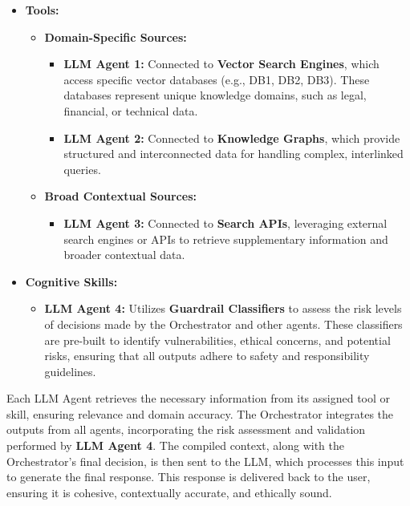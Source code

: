 \documentclass[12pt]{article}
\begin{document}
\begin{itemize}
    \item \textbf{Tools:}
    \begin{itemize}
        \item \textbf{Domain-Specific Sources:}
        \begin{itemize}
            \item \textbf{LLM Agent 1:} Connected to \textbf{Vector Search Engines}, which access specific vector databases (e.g., DB1, DB2, DB3). These databases represent unique knowledge domains, such as legal, financial, or technical data.
            \item \textbf{LLM Agent 2:} Connected to \textbf{Knowledge Graphs}, which provide structured and interconnected data for handling complex, interlinked queries.
        \end{itemize}
        \item \textbf{Broad Contextual Sources:}
        \begin{itemize}
            \item \textbf{LLM Agent 3:} Connected to \textbf{Search APIs}, leveraging external search engines or APIs to retrieve supplementary information and broader contextual data.
        \end{itemize}
    \end{itemize}
\newpage
    \item \textbf{Cognitive Skills:}
    \begin{itemize}
        \item \textbf{LLM Agent 4:} Utilizes \textbf{Guardrail Classifiers} to assess the risk levels of decisions made by the Orchestrator and other agents. These classifiers are pre-built to identify vulnerabilities, ethical concerns, and potential risks, ensuring that all outputs adhere to safety and responsibility guidelines.
    \end{itemize}
\end{itemize}

Each LLM Agent retrieves the necessary information from its assigned tool or skill, ensuring relevance and domain accuracy. The Orchestrator integrates the outputs from all agents, incorporating the risk assessment and validation performed by \textbf{LLM Agent 4}. The compiled context, along with the Orchestrator’s final decision, is then sent to the LLM, which processes this input to generate the final response. This response is delivered back to the user, ensuring it is cohesive, contextually accurate, and ethically sound.
\end{document}
